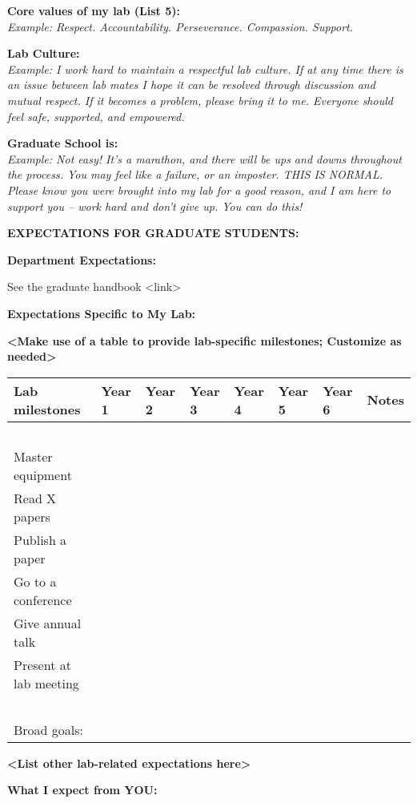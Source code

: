 \documentclass[]{article}
\begin{document}
\textbf{{Core values of my lab (List 5):}\\
}\emph{Example: Respect. Accountability. Perseverance. Compassion.
Support.}

\textbf{{Lab Culture:}\\
}\emph{Example: I work hard to maintain a respectful lab culture. If at
any time there is an issue between lab mates I hope it can be resolved
through discussion and mutual respect. If it becomes a problem, please
bring it to me. Everyone should feel safe, supported, and empowered.}

\textbf{{Graduate School is:}\\
}\emph{Example: Not easy! It's a marathon, and there will be ups and
downs throughout the process. You may feel like a failure, or an
imposter. THIS IS NORMAL. Please know you were brought into my lab for a
good reason, and I am here to support you -- work hard and don't give
up. You can do this!}

\textbf{{EXPECTATIONS FOR GRADUATE STUDENTS:}}

\textbf{{Department Expectations:}}

See the graduate handbook \textless{}link\textgreater{}

\textbf{{Expectations Specific to My Lab:}}

\textbf{{\textless{}Make use of a table to provide lab-specific
milestones; Customize as needed\textgreater{}}}

\begin{longtable}[]{@{}llllllll@{}}
\toprule
\textbf{Lab milestones} & \textbf{Year 1} & \textbf{Year 2} &
\textbf{Year 3} & \textbf{Year 4} & \textbf{Year 5} & \textbf{Year 6} &
\textbf{Notes}\tabularnewline
\midrule
\endhead
~ & ~ & ~ & ~ & ~ & ~ & ~ & ~\tabularnewline
Master equipment & ~ & ~ & ~ & ~ & ~ & ~ & ~\tabularnewline
Read X papers & ~ & ~ & ~ & ~ & ~ & ~ & ~\tabularnewline
Publish a paper & ~ & ~ & ~ & ~ & ~ & ~ & ~\tabularnewline
Go to a conference & ~ & ~ & ~ & ~ & ~ & ~ & ~\tabularnewline
Give annual talk & ~ & ~ & ~ & ~ & ~ & ~ & ~\tabularnewline
Present at lab meeting & ~ & ~ & ~ & ~ & ~ & ~ & ~\tabularnewline
~ & ~ & ~ & ~ & ~ & ~ & ~ & ~\tabularnewline
Broad goals: & ~ & ~ & ~ & ~ & ~ & ~ & ~\tabularnewline
\bottomrule
\end{longtable}

\textbf{{\textless{}List other lab-related expectations
here\textgreater{}}}

\textbf{{What I expect from YOU:\\
}}
\end{document}

